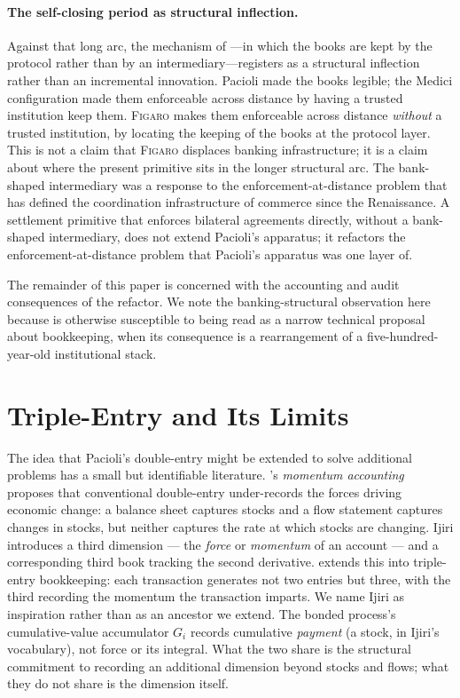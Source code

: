 \documentclass[11pt,a4paper]{article}
\theoremstyle{definition}
\theoremstyle{remark}
\newcommand{\figaro}{\textsc{Figaro}}
\begin{document}
\paragraph{The self-closing period as structural inflection.}
Against that long arc, the mechanism of 
---in which the books are kept by the protocol rather than by an
intermediary---registers as a structural inflection rather than
an incremental innovation. Pacioli made the books legible; the
Medici configuration made them enforceable across distance by
having a trusted institution keep them. \figaro{} makes them
enforceable across distance \emph{without} a trusted institution,
by locating the keeping of the books at the protocol layer. This
is not a claim that \figaro{} displaces banking infrastructure;
it is a claim about where the present primitive sits in the longer
structural arc. The bank-shaped intermediary was a response to the
enforcement-at-distance problem that has defined the coordination
infrastructure of commerce since the Renaissance. A settlement
primitive that enforces bilateral agreements directly, without a
bank-shaped intermediary, does not extend Pacioli's apparatus; it
refactors the enforcement-at-distance problem that Pacioli's
apparatus was one layer of.

The remainder of this paper is concerned with the accounting and
audit consequences of the refactor. We note the banking-structural
observation here because  is otherwise
susceptible to being read as a narrow technical proposal about
bookkeeping, when its consequence is a rearrangement of a
five-hundred-year-old institutional stack.

\section{Triple-Entry and Its Limits}
\label{sec:triple-entry}

The idea that Pacioli's double-entry might be extended to
solve additional problems has a small but identifiable
literature. \citet{ijiri1989momentum}'s \emph{momentum
accounting} proposes that conventional double-entry
under-records the forces driving economic change: a balance
sheet captures stocks and a flow statement captures changes in
stocks, but neither captures the rate at which stocks are
changing. Ijiri introduces a third dimension --- the
\emph{force} or \emph{momentum} of an account --- and a
corresponding third book tracking the second derivative.
\citet{ijiri1986triple} extends this into triple-entry
bookkeeping: each transaction generates not two entries but
three, with the third recording the momentum the transaction
imparts. We name Ijiri as inspiration rather than as an
ancestor we extend. The bonded process's cumulative-value
accumulator $G_i$ records cumulative \emph{payment} (a stock,
in Ijiri's vocabulary), not force or its integral. What the
two share is the structural commitment to recording an
additional dimension beyond stocks and flows; what they do
not share is the dimension itself.
\end{document}
